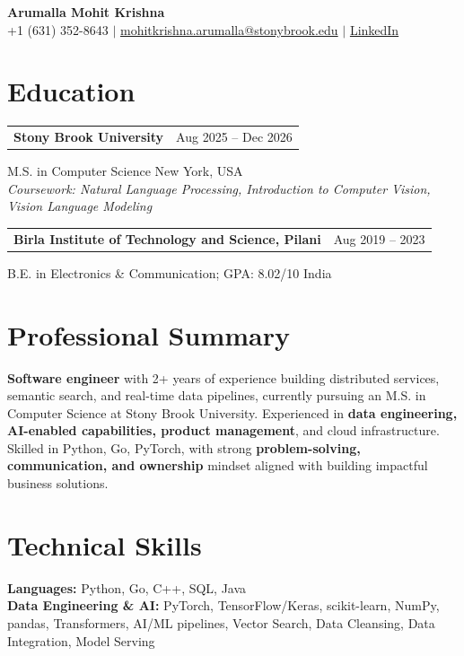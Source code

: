 \documentclass[letterpaper,10pt]{article}
\makeatletter
\newcommand{\entry}[2]{%
  \noindent
  \begin{tabularx}{\linewidth}
    {@{}>{\raggedright\arraybackslash}X@{\hspace{6pt}}r@{}}
    \textbf{#1} & #2
  \end{tabularx}\par
}
\makeatother
\begin{document}
\begin{center}
    {\LARGE\bfseries Arumalla Mohit Krishna}\\[3pt]
    +1 (631) 352-8643 $|$
    \href{mailto:mohitkrishna.arumalla@stonybrook.edu}
    {mohitkrishna.arumalla@stonybrook.edu} $|$
    \href{https://linkedin.com/in/mohit-krishna-arumalla}
    {LinkedIn}
\end{center}
\vspace{-8pt}

\section{Education}

\entry
  {\textbf{Stony Brook University}}
  {Aug 2025 -- Dec 2026}

M.S. in Computer Science \hfill New York, USA\\
\textit{
Coursework: Natural Language Processing,
Introduction to Computer Vision, Vision Language Modeling
}
\vspace{3pt}

\entry
  {\textbf{Birla Institute of Technology and Science, Pilani}}
  {Aug 2019 -- 2023}

B.E. in Electronics \& Communication; GPA: 8.02/10 \hfill India
\section{Professional Summary}

\textbf{Software engineer} with 2+ years of experience building distributed services, semantic search, and real-time data pipelines, currently pursuing an M.S. in Computer Science at Stony Brook University. Experienced in \textbf{data engineering, AI-enabled capabilities, product management}, and cloud infrastructure. Skilled in Python, Go, PyTorch, with strong \textbf{problem-solving, communication, and ownership} mindset aligned with building impactful business solutions.

\section{Technical Skills}

\textbf{Languages:}
Python, Go, C++, SQL, Java\\

\textbf{Data Engineering \& AI:}
PyTorch, TensorFlow/Keras, scikit-learn, NumPy, pandas,
Transformers, AI/ML pipelines, Vector Search, Data Cleansing,
Data Integration, Model Serving\\
\end{document}
